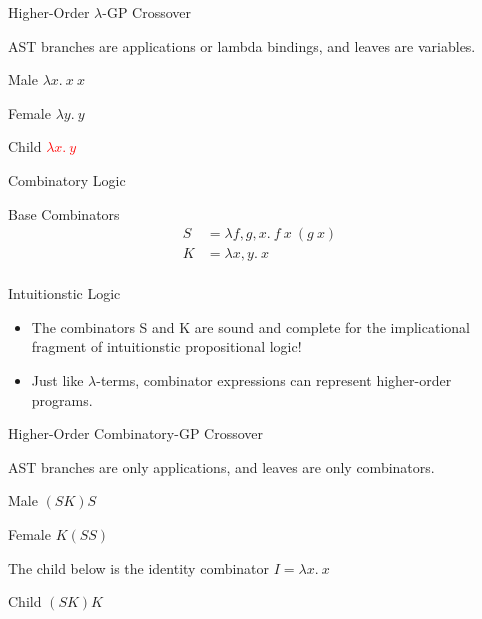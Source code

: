 \documentclass[mathserif]{beamer}
\newcommand{\diff}[1]{\textcolor{red}{#1}}
\begin{document}
\begin{frame}{Higher-Order $\lambda$-GP Crossover}

AST branches are applications or lambda bindings, and leaves are
variables.

\begin{block}{Male}
$\lambda x. ~ x ~ x$
\end{block}

\begin{block}{Female}
$\lambda y. ~ y$
\end{block}

\begin{block}{Child}
\diff{$\lambda x. ~ y$}
\end{block}

\end{frame}

\begin{frame}{Combinatory Logic}
\begin{block}{Base Combinators}
\begin{align*}
S &= \lambda f,g,x . ~ f ~ x ~ (g ~ x)\\
K &= \lambda x,y . ~ x\\
\end{align*}
\end{block}

\begin{block}{Intuitionstic Logic}
\begin{itemize}
\item
The combinators S and K are sound and complete for the implicational
fragment of intuitionstic propositional logic!
\item
Just like $\lambda$-terms, combinator expressions can represent
higher-order programs.
\end{itemize}
\end{block}

\end{frame}

\begin{frame}{Higher-Order Combinatory-GP Crossover}

AST branches are only applications, and leaves are only combinators.

\begin{block}{Male}
$(SK)S$
\end{block}

\begin{block}{Female}
$K(SS)$
\end{block}

The child below is the identity combinator $I = \lambda x . ~ x$

\begin{block}{Child}
$(SK)K$
\end{block}

\end{frame}
\end{document}
